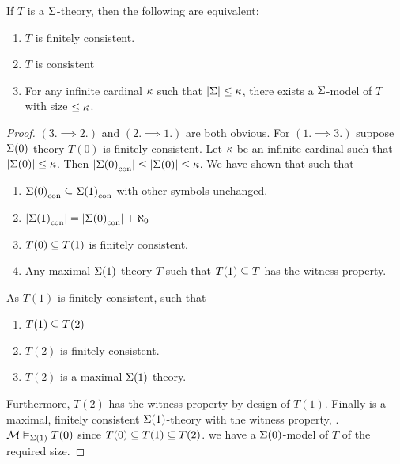 \begin{prop}
    If $T$ is a $\Sigma$-theory, 
    then the following are equivalent:
    \begin{enumerate}
        \item $T$ is finitely consistent.
        \item $T$ is consistent
        \item For any infinite cardinal $\kappa$ 
        such that $|\Sigma| \leq \kappa$, there exists a $\Sigma$-model of 
        $T$ with size $\leq \kappa$.
    \end{enumerate}
\end{prop}
\begin{proof}
    $(3. \implies 2.)$ and $(2. \implies 1.)$ are both obvious. 
    For $(1. \implies 3.)$
    suppose $\Sigma(0)$-theory $T(0)$ is finitely consistent.
    Let $\kappa$ be an infinite cardinal such that 
    $|\Sigma(0)| \leq \kappa$. Then
    $|{\Sigma(0)}_\mathrm{con}| \leq |\Sigma(0)| \leq \kappa$.
    We have shown that  such that 
    \begin{enumerate}
        \item ${\Sigma(0)}_\mathrm{con} \subseteq {\Sigma(1)}_\mathrm{con}$
        with other symbols unchanged.
        \item $|{\Sigma(1)}_\mathrm{con}| = |{\Sigma(0)}_\mathrm{con}| + \aleph_0$
        \item $T(0) \subseteq T(1)$ is finitely consistent.
        \item Any maximal $\Sigma(1)$-theory $T$ such that $T(1) \subseteq T$ 
        has the witness property.
    \end{enumerate}
    As $T(1)$ is finitely consistent,
     such that 
    \begin{enumerate}[resume]
        \item $T(1) \subseteq T(2)$
        \item $T(2)$ is finitely consistent.
        \item $T(2)$ is a maximal $\Sigma(1)$-theory.
    \end{enumerate}
    Furthermore, $T(2)$ has the witness property by design of $T(1)$.
    Finally is a maximal, finitely consistent $\Sigma(1)$-theory with 
    the witness property, .
    $\mathcal{M} \vDash_{\Sigma(1)} T(0)$ since $T(0) \subseteq T(1) \subseteq T(2)$.
     we have a $\Sigma(0)$-model
    of $T$ of the required size.
\end{proof}